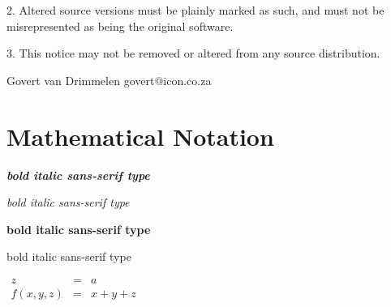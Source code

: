 2. Altered source versions must be plainly marked as such, and must not be
misrepresented as being the original software.

3. This notice may not be removed or altered from any source distribution.

\vparasmall
Govert van Drimmelen
govert@icon.co.za




%
%
%
%
%
%
%
%
%
%
%
%
%



\normalsize





\chapter{Mathematical Notation} 


{\bfseries\itshape\sffamily bold italic sans-serif type}

{\itshape\sffamily bold italic sans-serif type}

{\bfseries\sffamily bold italic sans-serif type}

{\sffamily bold italic sans-serif type}


$\begin{array}{lcl} z & = & a \\ f(x,y,z) & = & x + y + z \end{array}$


